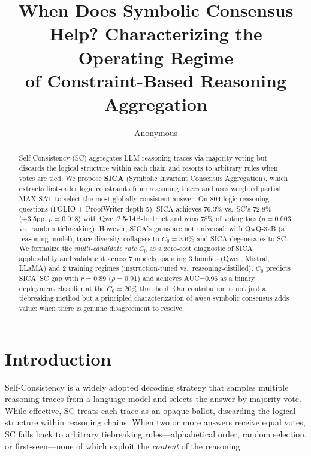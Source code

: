 \documentclass[11pt,a4paper]{article}
\title{When Does Symbolic Consensus Help? Characterizing the Operating Regime\\of Constraint-Based Reasoning Aggregation}
\author{Anonymous}
\begin{document}
\maketitle

\begin{abstract}
Self-Consistency (SC) aggregates LLM reasoning traces via majority voting but discards the logical structure within each chain and resorts to arbitrary rules when votes are tied. We propose \textbf{SICA} (Symbolic Invariant Consensus Aggregation), which extracts first-order logic constraints from reasoning traces and uses weighted partial MAX-SAT to select the most globally consistent answer. On 804 logic reasoning questions (FOLIO + ProofWriter depth-5), SICA achieves 76.3\% vs.\ SC's 72.8\% (+3.5pp, $p=0.018$) with Qwen2.5-14B-Instruct and wins 78\% of voting ties ($p=0.003$ vs.\ random tiebreaking). However, SICA's gains are not universal: with QwQ-32B (a reasoning model), trace diversity collapses to $C_0=3.6\%$ and SICA degenerates to SC. We formalize the \emph{multi-candidate rate} $C_0$ as a zero-cost diagnostic of SICA applicability and validate it across 7 models spanning 3 families (Qwen, Mistral, LLaMA) and 2 training regimes (instruction-tuned vs.\ reasoning-distilled). $C_0$ predicts SICA--SC gap with $r=0.89$ ($\rho=0.91$) and achieves AUC=0.96 as a binary deployment classifier at the $C_0=20\%$ threshold. Our contribution is not just a tiebreaking method but a principled characterization of \emph{when} symbolic consensus adds value: when there is genuine disagreement to resolve.
\end{abstract}

\section{Introduction}
\label{sec:intro}

Self-Consistency \cite{wang2023selfconsistency} is a widely adopted decoding strategy that samples multiple reasoning traces from a language model and selects the answer by majority vote. While effective, SC treats each trace as an opaque ballot, discarding the logical structure within reasoning chains. When two or more answers receive equal votes, SC falls back to arbitrary tiebreaking rules---alphabetical order, random selection, or first-seen---none of which exploit the \emph{content} of the reasoning.
\end{document}
